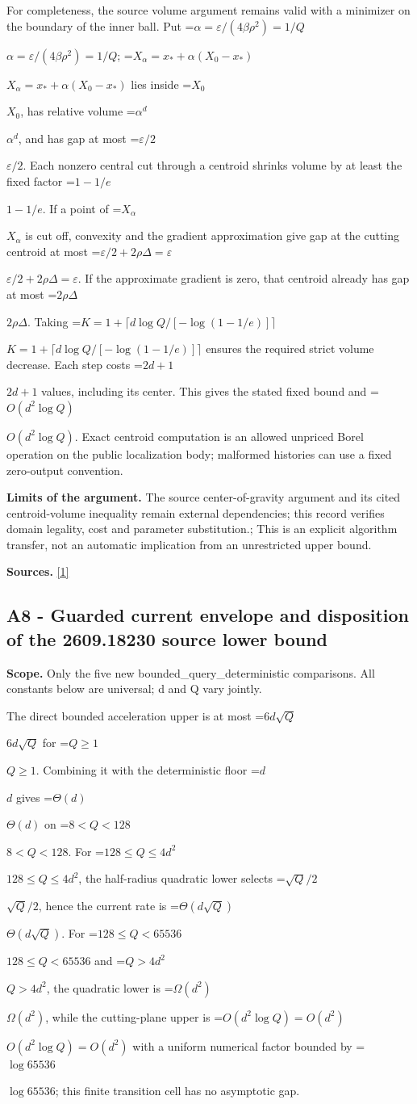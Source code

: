 \documentclass[10pt,a4paper]{article}
\newcommand{\AtlasMath}[1]{\par\begingroup\centering\setbox0=\hbox{$\displaystyle #1$}\ifdim\wd0>1.4\linewidth\typeout{ATLAS WIDE FORMULA: \the\wd0}\fi\ifdim\wd0>\linewidth\resizebox{\linewidth}{!}{\box0}\else\box0\fi\par\endgroup}
\newcommand{\AtlasInlineMath}[1]{\begingroup\setbox0=\hbox{$#1$}\ifdim\wd0>.4\linewidth\endgroup\AtlasMath{#1}\else\endgroup$#1$\fi}
\begin{document}
For completeness, the source volume argument remains valid with a minimizer on the boundary of the inner ball. Put \AtlasInlineMath{\alpha=\varepsilon/(4\beta\rho^2)=1/Q}; \AtlasInlineMath{X_\alpha=x_*+\alpha(X_0-x_*)} lies inside \AtlasInlineMath{X_0}, has relative volume \AtlasInlineMath{\alpha^d}, and has gap at most \AtlasInlineMath{\varepsilon/2}. Each nonzero central cut through a centroid shrinks volume by at least the fixed factor \AtlasInlineMath{1-1/e}. If a point of \AtlasInlineMath{X_\alpha} is cut off, convexity and the gradient approximation give gap at the cutting centroid at most \AtlasInlineMath{\varepsilon/2+2\rho\Delta=\varepsilon}. If the approximate gradient is zero, that centroid already has gap at most \AtlasInlineMath{2\rho\Delta}. Taking \AtlasInlineMath{K=1+\lceil d\log Q/[-\log(1-1/e)]\rceil} ensures the required strict volume decrease. Each step costs \AtlasInlineMath{2d+1} values, including its center. This gives the stated fixed bound and \AtlasInlineMath{O(d^2\log Q)}. Exact centroid computation is an allowed unpriced Borel operation on the public localization body; malformed histories can use a fixed zero-output convention.

\textbf{Limits of the argument.} The source center-of-gravity argument and its cited centroid-volume inequality remain external dependencies; this record verifies domain legality, cost and parameter substitution.; This is an explicit algorithm transfer, not an automatic implication from an unrestricted upper bound.

\textbf{Sources.} \href{https://arxiv.org/html/2610.00345v1}{[1]}

\subsection{A8 - Guarded current envelope and disposition of the 2609.18230 source lower bound}
\textbf{Scope.} Only the five new bounded\_query\_deterministic comparisons. All constants below are universal; d and Q vary jointly.

The direct bounded acceleration upper is at most \AtlasInlineMath{6d\sqrt Q} for \AtlasInlineMath{Q\ge1}. Combining it with the deterministic floor \AtlasInlineMath{d} gives \AtlasInlineMath{\Theta(d)} on \AtlasInlineMath{8<Q<128}. For \AtlasInlineMath{128\le Q\le4d^2}, the half-radius quadratic lower selects \AtlasInlineMath{\sqrt Q/2}, hence the current rate is \AtlasInlineMath{\Theta(d\sqrt Q)}. For \AtlasInlineMath{128\le Q<65536} and \AtlasInlineMath{Q>4d^2}, the quadratic lower is \AtlasInlineMath{\Omega(d^2)}, while the cutting-plane upper is \AtlasInlineMath{O(d^2\log Q)=O(d^2)} with a uniform numerical factor bounded by \AtlasInlineMath{\log65536}; this finite transition cell has no asymptotic gap.
\end{document}
